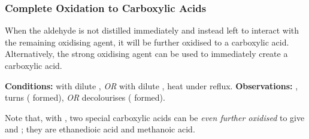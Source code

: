 


			\pagebreak
			\hypertarget{CompleteOxidationOfPrimaryAlcohols}{}
			\subsubsection{Complete Oxidation to Carboxylic Acids}

				When the aldehyde is not distilled immediately and instead left to interact with the remaining oxidising agent, it will
				be further oxidised to a carboxylic acid. Alternatively, the strong oxidising agent  can be used to immediately
				create a carboxylic acid.

				\vspace{1.5em}
				\vbox{\textbf{Conditions:}	\tabto{35mm} with dilute , \textit{OR}  with dilute ,
											\tabto{35mm}heat under reflux.}
				\vspace{0.75em}
				\vbox{\textbf{Observations:}\tabto{35mm} , turns 
														( formed), \textit{OR}
											\tabto{35mm}  decolourises ( formed).}





				Note that, with , two special carboxylic acids can be \textit{even further oxidised} to give  and ;
				they are ethanedioic acid and methanoic acid.



